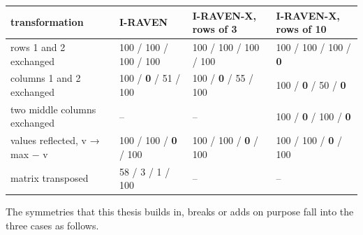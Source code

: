 \begin{center}\small
\begin{tabularx}{\linewidth}{@{}YYYY@{}}
\toprule
transformation & I-RAVEN & I-RAVEN-X, rows of 3 & I-RAVEN-X, rows of 10 \\
\midrule
rows 1 and 2 exchanged & 100 / 100 / 100 / 100 & 100 / 100 / 100 / 100 & 100 / 100 / 100 / \textbf{0} \\
columns 1 and 2 exchanged & 100 / \textbf{0} / 51 / 100 & 100 / \textbf{0} / 55 / 100 & 100 / \textbf{0} / 50 / \textbf{0} \\
two middle columns exchanged & – & – & 100 / \textbf{0} / 100 / \textbf{0} \\
values reflected, v → max − v & 100 / 100 / \textbf{0} / 100 & 100 / 100 / \textbf{0} / 100 & 100 / 100 / \textbf{0} / 100 \\
matrix transposed & 58 / 3 / 1 / 100 & – & – \\
\bottomrule
\end{tabularx}
\end{center}

The symmetries that this thesis builds in, breaks or adds on purpose fall into the three cases as follows.

